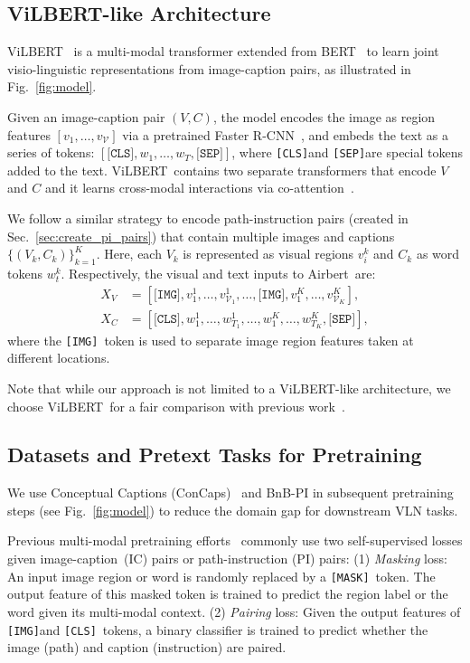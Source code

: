 \RequirePackage[dvipsnames,table]{xcolor} \documentclass[10pt,twocolumn,letterpaper]{article}
\newcommand{\vilbert}{ViLBERT}
\newcommand{\airbert}{Airbert}
\newcommand{\airbnb}{BnB}
\newcommand{\mask}{\texttt{[MASK]}}
\newcommand{\cls}{\texttt{[CLS]}}
\newcommand{\sep}{\texttt{[SEP]}}
\newcommand{\imgtok}{\texttt{[IMG]}}
\newcommand{\mcV}{\mathcal{V}}
\begin{document}
\subsection{\vilbert-like Architecture}
\vilbert~\cite{lu2019vilbert} is a multi-modal transformer extended from BERT~\cite{devlin2018bert} to learn joint visio-linguistic representations from image-caption pairs, as illustrated in Fig.~\ref{fig:model}.

Given an image-caption pair $(V, C)$, the model encodes the image as region features $[v_1, \ldots, v_\mcV ]$ via a pretrained Faster R-CNN~\cite{anderson2017butd}, and embeds the text as a series of tokens: $[\cls, w_1, \ldots, w_T, \sep]$, where \cls and \sep are special tokens added to the text.
\vilbert~contains two separate transformers that encode $V$ and $C$ and it learns cross-modal interactions via co-attention~\cite{lu2019vilbert}.

We follow a similar strategy to encode path-instruction pairs (created in Sec.~\ref{sec:create_pi_pairs}) that contain multiple images and captions $\{(V_k, C_k)\}_{k=1}^K$.
Here, each $V_k$ is represented as visual regions $v^k_i$ and $C_k$ as word tokens $w^k_t$.
Respectively, the visual and text inputs to \airbert~are:
{\small
\begin{align}
X_V &= [\imgtok, v^1_1, \ldots, v^1_{\mcV_1}, \ldots, \imgtok, v^K_1, \ldots, v^K_{\mcV_K}], \\
X_C &= [\cls, w^1_1, \ldots, w^1_{T_1}, \ldots, w^K_1, \ldots, w^K_{T_K}, \sep ] ,
\end{align}}where the \imgtok~token is used to separate image region features taken at different locations.

Note that while our approach is not limited to a \vilbert-like architecture, we choose \vilbert~for a fair comparison with previous work~\cite{majumdar2020vlnbert}.



\subsection{Datasets and Pretext Tasks for Pretraining}
We use Conceptual Captions (ConCaps)~\cite{ConceptualCaptions} and \airbnb-PI in subsequent pretraining steps (see Fig.~\ref{fig:model}) to reduce the domain gap for downstream VLN tasks.

Previous multi-modal pretraining efforts~\cite{lu2019vilbert, majumdar2020vlnbert, huang2019transferable} commonly use two self-supervised losses given image-caption~(IC) pairs or path-instruction (PI) pairs:
(1) \emph{Masking} loss:
An input image region or word is randomly replaced by a \mask~token.
The output feature of this masked token is trained to predict the region label or the word given its multi-modal context.
(2) \emph{Pairing} loss: 
Given the output features of \imgtok and \cls~tokens, a binary classifier is trained to predict whether the image (path) and caption (instruction) are paired.
\end{document}
